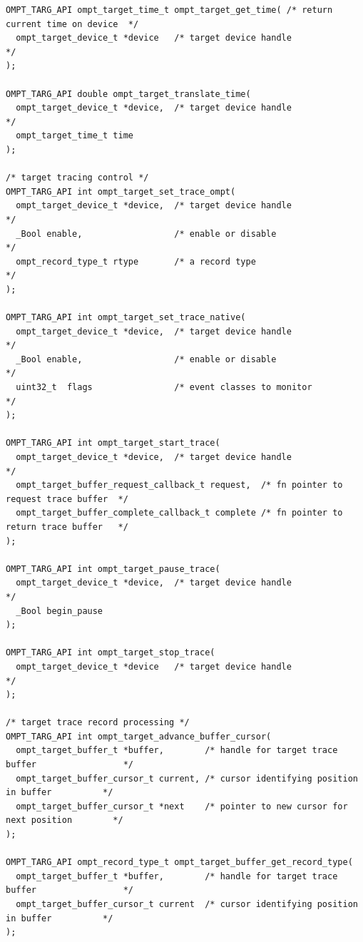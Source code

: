 \documentclass{article}
\begin{document}
{\begin{verbatim}
OMPT_TARG_API ompt_target_time_t ompt_target_get_time( /* return current time on device  */
  ompt_target_device_t *device   /* target device handle                                 */
);

OMPT_TARG_API double ompt_target_translate_time(
  ompt_target_device_t *device,  /* target device handle                                 */
  ompt_target_time_t time
);

/* target tracing control */
OMPT_TARG_API int ompt_target_set_trace_ompt(
  ompt_target_device_t *device,  /* target device handle                                 */
  _Bool enable,                  /* enable or disable                                    */
  ompt_record_type_t rtype       /* a record type                                        */
);

OMPT_TARG_API int ompt_target_set_trace_native(
  ompt_target_device_t *device,  /* target device handle                                 */
  _Bool enable,                  /* enable or disable                                    */
  uint32_t  flags                /* event classes to monitor                             */
);

OMPT_TARG_API int ompt_target_start_trace(
  ompt_target_device_t *device,  /* target device handle                                 */
  ompt_target_buffer_request_callback_t request,  /* fn pointer to request trace buffer  */
  ompt_target_buffer_complete_callback_t complete /* fn pointer to return trace buffer   */
);

OMPT_TARG_API int ompt_target_pause_trace(
  ompt_target_device_t *device,  /* target device handle                                 */
  _Bool begin_pause
);

OMPT_TARG_API int ompt_target_stop_trace(
  ompt_target_device_t *device   /* target device handle                                 */
);

/* target trace record processing */
OMPT_TARG_API int ompt_target_advance_buffer_cursor(
  ompt_target_buffer_t *buffer,        /* handle for target trace buffer                 */
  ompt_target_buffer_cursor_t current, /* cursor identifying position in buffer          */
  ompt_target_buffer_cursor_t *next    /* pointer to new cursor for next position        */
);

OMPT_TARG_API ompt_record_type_t ompt_target_buffer_get_record_type(
  ompt_target_buffer_t *buffer,        /* handle for target trace buffer                 */
  ompt_target_buffer_cursor_t current  /* cursor identifying position in buffer          */
);


\end{verbatim}}
\end{document}
